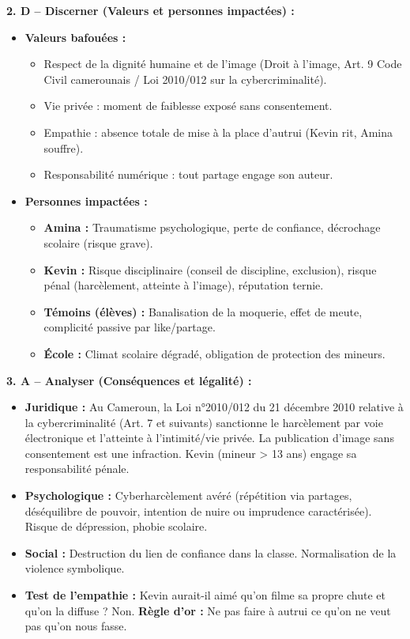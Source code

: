\documentclass[11pt]{article}
\newcommand{\cle}[1]{{\popxbold\color{popdark}#1}}
\begin{document}
\begin{exoresolu}
\textbf{2. D -- Discerner (Valeurs et personnes impactées) :}
\begin{itemize}
    \item \textbf{Valeurs bafouées :}
    \begin{itemize}
        \item \cle{Respect de la dignité humaine} et de l'image (Droit à l'image, Art. 9 Code Civil camerounais / Loi 2010/012 sur la cybercriminalité).
        \item \cle{Vie privée} : moment de faiblesse exposé sans consentement.
        \item \cle{Empathie} : absence totale de mise à la place d'autrui (Kevin rit, Amina souffre).
        \item \cle{Responsabilité numérique} : tout partage engage son auteur.
    \end{itemize}
    \item \textbf{Personnes impactées :}
    \begin{itemize}
        \item \textbf{Amina :} Traumatisme psychologique, perte de confiance, décrochage scolaire (risque grave).
        \item \textbf{Kevin :} Risque disciplinaire (conseil de discipline, exclusion), risque pénal (harcèlement, atteinte à l'image), réputation ternie.
        \item \textbf{Témoins (élèves) :} Banalisation de la moquerie, effet de meute, complicité passive par like/partage.
        \item \textbf{École :} Climat scolaire dégradé, obligation de protection des mineurs.
    \end{itemize}
\end{itemize}

\textbf{3. A -- Analyser (Conséquences et légalité) :}
\begin{itemize}
    \item \textbf{Juridique :} Au Cameroun, la Loi n°2010/012 du 21 décembre 2010 relative à la cybercriminalité (Art. 7 et suivants) sanctionne le harcèlement par voie électronique et l'atteinte à l'intimité/vie privée. La publication d'image sans consentement est une infraction. Kevin (mineur > 13 ans) engage sa responsabilité pénale.
    \item \textbf{Psychologique :} Cyberharcèlement avéré (répétition via partages, déséquilibre de pouvoir, intention de nuire ou imprudence caractérisée). Risque de dépression, phobie scolaire.
    \item \textbf{Social :} Destruction du lien de confiance dans la classe. Normalisation de la violence symbolique.
    \item \textbf{Test de l'empathie :} Kevin aurait-il aimé qu'on filme sa propre chute et qu'on la diffuse ? Non. \textbf{Règle d'or :} Ne pas faire à autrui ce qu'on ne veut pas qu'on nous fasse.
\end{itemize}


\end{exoresolu}
\end{document}
